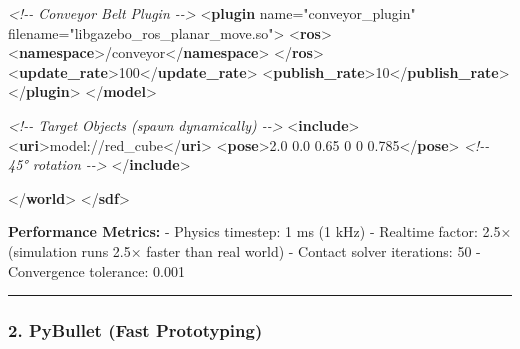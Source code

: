 \documentclass[
]{article}
\newenvironment{Shaded}{\begin{snugshade}}{\end{snugshade}}
\newcommand{\CommentTok}[1]{\textcolor[rgb]{0.56,0.35,0.01}{\textit{#1}}}
\newcommand{\KeywordTok}[1]{\textcolor[rgb]{0.13,0.29,0.53}{\textbf{#1}}}
\newcommand{\NormalTok}[1]{#1}
\newcommand{\OtherTok}[1]{\textcolor[rgb]{0.56,0.35,0.01}{#1}}
\newcommand{\StringTok}[1]{\textcolor[rgb]{0.31,0.60,0.02}{#1}}
\begin{document}
\begin{Shaded}
\begin{Highlighting}[]
      \CommentTok{\textless{}!{-}{-} Conveyor Belt Plugin {-}{-}\textgreater{}}
\NormalTok{      \textless{}}\KeywordTok{plugin}\OtherTok{ name=}\StringTok{"conveyor\_plugin"}\OtherTok{ filename=}\StringTok{"libgazebo\_ros\_planar\_move.so"}\NormalTok{\textgreater{}}
\NormalTok{        \textless{}}\KeywordTok{ros}\NormalTok{\textgreater{}}
\NormalTok{          \textless{}}\KeywordTok{namespace}\NormalTok{\textgreater{}/conveyor\textless{}/}\KeywordTok{namespace}\NormalTok{\textgreater{}}
\NormalTok{        \textless{}/}\KeywordTok{ros}\NormalTok{\textgreater{}}
\NormalTok{        \textless{}}\KeywordTok{update\_rate}\NormalTok{\textgreater{}100\textless{}/}\KeywordTok{update\_rate}\NormalTok{\textgreater{}}
\NormalTok{        \textless{}}\KeywordTok{publish\_rate}\NormalTok{\textgreater{}10\textless{}/}\KeywordTok{publish\_rate}\NormalTok{\textgreater{}}
\NormalTok{      \textless{}/}\KeywordTok{plugin}\NormalTok{\textgreater{}}
\NormalTok{    \textless{}/}\KeywordTok{model}\NormalTok{\textgreater{}}

    \CommentTok{\textless{}!{-}{-} Target Objects (spawn dynamically) {-}{-}\textgreater{}}
\NormalTok{    \textless{}}\KeywordTok{include}\NormalTok{\textgreater{}}
\NormalTok{      \textless{}}\KeywordTok{uri}\NormalTok{\textgreater{}model://red\_cube\textless{}/}\KeywordTok{uri}\NormalTok{\textgreater{}}
\NormalTok{      \textless{}}\KeywordTok{pose}\NormalTok{\textgreater{}2.0 0.0 0.65 0 0 0.785\textless{}/}\KeywordTok{pose}\NormalTok{\textgreater{}  }\CommentTok{\textless{}!{-}{-} 45° rotation {-}{-}\textgreater{}}
\NormalTok{    \textless{}/}\KeywordTok{include}\NormalTok{\textgreater{}}

\NormalTok{  \textless{}/}\KeywordTok{world}\NormalTok{\textgreater{}}
\NormalTok{\textless{}/}\KeywordTok{sdf}\NormalTok{\textgreater{}}
\end{Highlighting}
\end{Shaded}

\textbf{Performance Metrics:} - Physics timestep: 1 ms (1 kHz) -
Realtime factor: 2.5× (simulation runs 2.5× faster than real world) -
Contact solver iterations: 50 - Convergence tolerance: 0.001

\begin{center}\rule{0.5\linewidth}{0.5pt}\end{center}

\hypertarget{pybullet-fast-prototyping}{%
\subsubsection{2. PyBullet (Fast
Prototyping)}\label{pybullet-fast-prototyping}}
\end{document}
